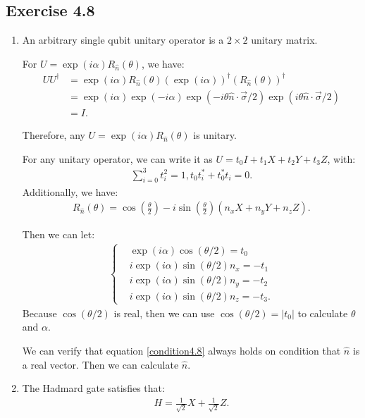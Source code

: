 \subsection*{Exercise 4.8}
\begin{enumerate}[1.]
    \item 
    An arbitrary single qubit unitary operator is a $2\times 2$ unitary matrix.
    
    For $U=\exp(i\alpha)R_{\hat n}(\theta)$, we have:
    \begin{align}
        UU^\dagger&=\exp(i\alpha)R_{\hat n}(\theta)(\exp(i\alpha))^\dagger (R_{\hat n}(\theta))^\dagger\\
        &=\exp(i\alpha)\exp(-i\alpha)\exp(-i\theta\hat n\cdot\vec \sigma/2)\exp(i\theta\hat n\cdot\vec \sigma/2)\\
        &=I.
    \end{align}
    
    Therefore, any $U=\exp(i\alpha)R_{\hat n}(\theta)$ is unitary.
    
    For any unitary operator, we can write it as $U=t_0 I+t_1 X+t_2 Y+t_3 Z$, with:
    \begin{align}
        \sum_{i=0}^{3}t_i^2=1,t_0t_i^*+t_0^*t_i=0.
        \label{condition4.8}
    \end{align}
    Additionally, we have:
    \begin{align}
        R_{\hat n}(\theta)=\cos\left(\frac{\theta}{2}\right)-i\sin\left(\frac{\theta}{2}\right)(n_xX+n_yY+n_zZ).
    \end{align}
    
    Then we can let:
    \begin{align}
    \left\{
    \begin{array}{cc}
        & \exp(i\alpha)\cos(\theta/2)=t_0\\
        & i\exp(i\alpha)\sin(\theta/2)n_x=-t_1\\
        & i\exp(i\alpha)\sin(\theta/2)n_y=-t_2\\
        & i\exp(i\alpha)\sin(\theta/2)n_z=-t_3.
    \end{array}
        \right.
    \end{align}
    Because $\cos(\theta/2)$ is real, then we can use $\cos(\theta/2)=|t_0|$ to calculate $\theta$ and $\alpha$.
    
    We can verify that equation \ref{condition4.8} always holds on condition that $\hat n$ is a real vector. Then we can calculate $\hat n$.
    \item The Hadmard gate satisfies that:
    \begin{align}
        H=\frac{1}{\sqrt{2}}X+\frac{1}{\sqrt{2}}Z.
    \end{align}
    

\end{enumerate}
